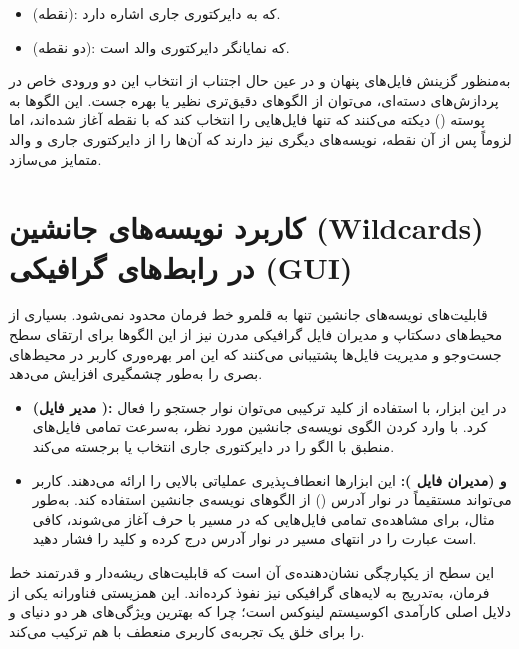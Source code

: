 \begin{itemize}
  \item {} (نقطه): که به دایرکتوری جاری اشاره دارد.
  \item {} (دو نقطه): که نمایانگر دایرکتوری والد است.
\end{itemize}

به‌منظور گزینش فایل‌های پنهان و در عین حال اجتناب از انتخاب این دو ورودی خاص در پردازش‌های دسته‌ای، می‌توان از الگوهای دقیق‌تری نظیر  یا  بهره جست. این الگوها به پوسته () دیکته می‌کنند که تنها فایل‌هایی را انتخاب کند که با نقطه آغاز شده‌اند، اما لزوماً پس از آن نقطه، نویسه‌های دیگری نیز دارند که آن‌ها را از دایرکتوری جاری و والد متمایز می‌سازد.

\section{کاربرد نویسه‌های جانشین (Wildcards) در رابط‌های گرافیکی (GUI)}

قابلیت‌های نویسه‌های جانشین تنها به قلمرو خط فرمان محدود نمی‌شود. بسیاری از محیط‌های دسکتاپ و مدیران فایل گرافیکی مدرن نیز از این الگوها برای ارتقای سطح جست‌وجو و مدیریت فایل‌ها پشتیبانی می‌کنند که این امر بهره‌وری کاربر در محیط‌های بصری را به‌طور چشمگیری افزایش می‌دهد.

\begin{itemize}
  \item \textbf{ (مدیر فایل ):} در این ابزار، با استفاده از کلید ترکیبی  می‌توان نوار جستجو را فعال کرد. با وارد کردن الگوی نویسه‌ی جانشین مورد نظر،  به‌سرعت تمامی فایل‌های منطبق با الگو را در دایرکتوری جاری انتخاب یا برجسته می‌کند.

  \item \textbf{ و  (مدیران فایل ):} این ابزارها انعطاف‌پذیری عملیاتی بالایی را ارائه می‌دهند. کاربر می‌تواند مستقیماً در نوار آدرس () از الگوهای نویسه‌ی جانشین استفاده کند. به‌طور مثال، برای مشاهده‌ی تمامی فایل‌هایی که در مسیر  با حرف  آغاز می‌شوند، کافی است عبارت  را در انتهای مسیر در نوار آدرس درج کرده و کلید  را فشار دهید.
\end{itemize}

این سطح از یکپارچگی نشان‌دهنده‌ی آن است که قابلیت‌های ریشه‌دار و قدرتمند خط فرمان، به‌تدریج به لایه‌های گرافیکی نیز نفوذ کرده‌اند. این همزیستی فناورانه یکی از دلایل اصلی کارآمدی اکوسیستم لینوکس است؛ چرا که بهترین ویژگی‌های هر دو دنیای  و  را برای خلق یک تجربه‌ی کاربری منعطف با هم ترکیب می‌کند.

